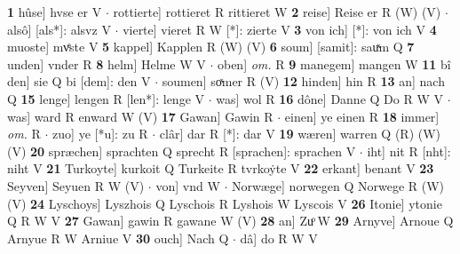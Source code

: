 \documentclass[8pt,a4paper,notitlepage]{article}
\begin{document}
\begin{table}[ht]
\begin{minipage}[t]{0.5\linewidth}
\textbf{1} hûse] hvse er V  $\cdot$ rottierte] rottieret R rittieret W \textbf{2} reise] Reise er R (W) (V)  $\cdot$ alsô] [als*]: alsvz V  $\cdot$ vierte] vieret R W [*]: zierte V \textbf{3} von ich] [*]: von ich V \textbf{4} muoste] mvͤste V \textbf{5} kappel] Kapplen R (W) (V) \textbf{6} soum] [samit]: sauͯm Q \textbf{7} unden] vnder R \textbf{8} helm] Helme W V  $\cdot$ oben] \textit{om.} R \textbf{9} manegem] mangen W \textbf{11} bî den] sie Q bi [dem]: den V  $\cdot$ soumen] soͯmer R (V) \textbf{12} hinden] hin R \textbf{13} an] nach Q \textbf{15} lenge] lengen R [len*]: lenge V  $\cdot$ was] wol R \textbf{16} dône] Danne Q Do R W V  $\cdot$ was] ward R enward W (V) \textbf{17} Gawan] Gawin R  $\cdot$ einen] ye einen R \textbf{18} immer] \textit{om.} R  $\cdot$ zuo] ye [*u]: zu R  $\cdot$ clâr] dar R [*]: dar V \textbf{19} wæren] warren Q (R) (W) (V) \textbf{20} spræchen] sprachten Q sprecht R [sprachen]: sprachen V  $\cdot$ iht] nit R [nht]: niht V \textbf{21} Turkoyte] kurkoit Q Turkeite R tvrkoẏte V \textbf{22} erkant] benant V \textbf{23} Seyven] Seyuen R W (V)  $\cdot$ von] vnd W  $\cdot$ Norwæge] norwegen Q Norwege R (W) (V) \textbf{24} Lyschoys] Lyszhois Q Lyschois R Lyshois W Lyscois V \textbf{26} Itonie] ytonie Q R W V \textbf{27} Gawan] gawin R gawane W (V) \textbf{28} an] Zuͦ W \textbf{29} Arnyve] Arnoue Q Arnyue R W Arniue V \textbf{30} ouch] Nach Q  $\cdot$ dâ] do R W V \newline
\end{minipage}
\end{table}
\end{document}
